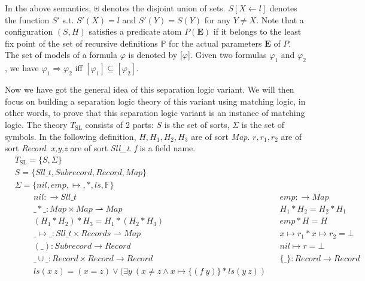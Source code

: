 \documentclass{article}
\theoremstyle{plain}
\begin{document}
In the above semantics, $\uplus$ denotes the disjoint union of sets. $ S[X\gets\mathit{l}]$ denotes the function $S'$ s.t. $S'(X) = l$ and $S'(Y)=S(Y)$ for any $Y \ne X$. Note that a configuration $(S,H)$ satisfies a predicate atom $P(\mathbf{E})$ if it belongs to the least fix point of the set of recursive definitions $\mathbb{P}$ for the actual parameters $\mathbf{E}$ of $P$. The set of models of a formula $\varphi$ is denoted by [$\varphi$]. Given two formulas $\varphi_1$ and $\varphi_2$, we have $\varphi_1 \Rightarrow \varphi_2$ iff $[\varphi_1] \subseteq [\varphi_2]$.

Now we have got the general idea of this separation logic variant. We will then focus on building a separation logic theory of this variant using matching logic, in other words, to prove that this separation logic variant is an instance of matching logic. The theory $T_{\mathrm{SL}}$ consists of 2 parts: $S$ is the set of sorts, $\Sigma$ is the set of symbols. In the following definition, $\mathit{H,H_1,H_2,H_3}$ are of sort \textit{Map}. $\mathit{r,r_1,r_2}$ are of sort \textit{Record}. \textit{x,y,z} are of sort \textit{Sll\_t}. \textit{f} is a field name.
\begin{align*}
&T_{\mathrm{SL}} =  \{ S , \Sigma \}\\
& S =  \{\mathit{Sll\_t} , \mathit{Subrecord} ,  \mathit{Record} , \mathit{Map} \} \\
&\Sigma = \{\mathit{nil} , \mathit{emp} , \mapsto ,  \mathit{*} , \mathit{ls} , \mathbb{F }\}\\
&\qquad\ nil:\to\mathit{Sll\_t} & &\mathit{emp}:\to \mathit{Map} \\ 
&\qquad\ \_*\_:\mathit{Map}\times\mathit{Map}\rightharpoonup Map& &\mathit{H_1 * H_2 = H_2 * H_1}\\
&\qquad\ (H_1 * H_2) * H_3 = H_1 * (H_2 * H_3)& & \mathit{emp}*\mathit{H}=\mathit{H}\\
&\qquad\ \_ \mapsto \_ :Sll\_t\times Records \rightharpoonup Map& & x \mapsto r_1 * x \mapsto r_2 = \bot\\
&\qquad\ \mathit{(\_)}:\mathit{Subrecord}\to\mathit{Record}& &nil \mapsto r = \bot
\\
&\qquad\ \_\cup\_:\mathit{Record}\times\mathit{Record}\to\mathit{Record} & &\{\_\}:\mathit{Record}\to\mathit{Record} \\&\qquad\ \mathit{ls} (x\ z) = (x = z)\vee ( \exists y\ (x \ne z \wedge x \mapsto \{( f\ y)\} *\mathit{ls} (y\ z))
\end{align*}
\end{document}
